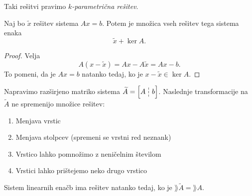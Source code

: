 \documentclass[12pt, a4paper]{article}
\begin{document}
Taki rešitvi pravimo \emph{$k$-parametrična rešitev}.

\begin{izrek}
Naj bo $\widetilde{x}$ rešitev sistema $Ax=b$. Potem je množica vseh rešitev tega sistema enaka
\[
\widetilde{x}+\ker A.
\]
\end{izrek}

\begin{proof}
Velja
\[
A(x-\widetilde{x})=Ax-A\widetilde{x}=Ax-b.
\]
To pomeni, da je $Ax=b$ natanko tedaj, ko je $x-\widetilde{x}\in\ker A$.
\end{proof}

Napravimo razširjeno matriko sistema $\widetilde{A}=\left[A\dashline b\right]$. Naslednje transformacije na $\widetilde{A}$ ne spremenijo množice rešitev:

\begin{enumerate}
\item Menjava vrstic
\item Menjava stolpcev (spremeni se vrstni red neznank)
\item Vrstico lahko pomnožimo z neničelnim številom
\item Vrstici lahko prištejemo neko drugo vrstico
\end{enumerate}

\begin{izrek}
Sistem linearnih enačb ima rešitev natanko tedaj, ko je $\rang\widetilde{A}=\rang A$.
\end{izrek}
\end{document}
